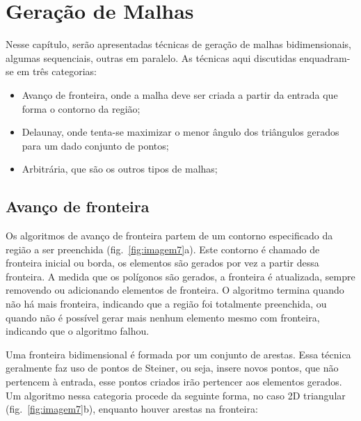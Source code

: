 \pagestyle{empty}
\cleardoublepage
\pagestyle{fancy}

\chapter{Geração de Malhas}\label{cap3}

Nesse capítulo, serão apresentadas técnicas de geração de malhas bidimensionais, algumas sequenciais, outras em paralelo. As técnicas aqui discutidas enquadram-se em três categorias:

\begin{itemize}
  \item Avanço de fronteira, onde a malha deve ser criada a partir da entrada que forma o contorno da região;

  \item Delaunay, onde tenta-se maximizar o menor ângulo dos triângulos gerados para um dado conjunto de pontos;

  \item Arbitrária, que são os outros tipos de malhas;
\end{itemize}

\section{Avanço de fronteira}

Os algoritmos de avanço de fronteira partem de um contorno especificado da região a ser preenchida (fig.~\ref{fig:imagem7}a). Este contorno é chamado de fronteira inicial ou borda, os elementos são gerados por vez a partir dessa fronteira. A medida que os polígonos são gerados, a fronteira é atualizada, sempre removendo ou adicionando elementos de fronteira. O algoritmo termina quando não há mais fronteira, indicando que a região foi totalmente preenchida, ou quando não é possível gerar mais nenhum elemento mesmo com fronteira, indicando que o algoritmo falhou.

Uma fronteira bidimensional é formada por um conjunto de arestas. Essa técnica geralmente faz uso de pontos de Steiner, ou seja, insere novos pontos, que não pertencem à entrada, esse pontos criados irão pertencer aos elementos gerados. Um algoritmo nessa categoria procede da seguinte forma, no caso 2D triangular (fig.~\ref{fig:imagem7}b), enquanto houver arestas na fronteira:
 
